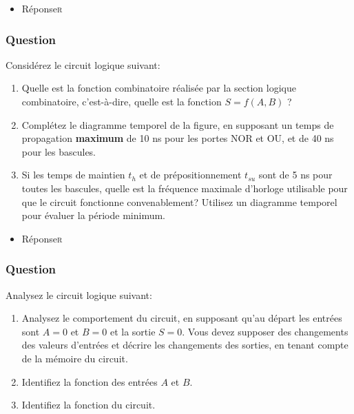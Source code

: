 \documentclass[11pt]{article}
\begin{document}
\begin{itemize}
\item Réponse\hfill{}\textsc{r}
\label{sec:orge0a9138}
\end{itemize}

\subsubsection*{Question}
\label{sec:orgdc3d4f6}
 Considérez le circuit logique suivant:
\begin{center}

\end{center}

\begin{enumerate}
\item Quelle est la fonction combinatoire réalisée par la section
logique combinatoire, c'est-à-dire, quelle est la fonction \(S =
         f(A,B)\) ?

\item Complétez le diagramme temporel de la figure, en supposant un
temps de propagation \textbf{maximum} de 10 ns pour les portes NOR et OU,
et de 40 ns pour les bascules.

\item Si les temps de maintien \(t_{h}\) et de prépositionnement \(t_{su}\)
sont de 5 ns pour toutes les bascules, quelle est la fréquence
maximale d'horloge utilisable pour que le circuit fonctionne
convenablement? Utilisez un diagramme temporel pour évaluer la
période minimum.
\end{enumerate}

\begin{itemize}
\item Réponse\hfill{}\textsc{r}
\label{sec:orgba7511a}
\end{itemize}

\subsubsection*{Question}
\label{sec:org9fb47fd}
 Analysez le circuit logique suivant:
\begin{center}

\end{center}

\begin{enumerate}
\item Analysez le comportement du circuit, en supposant qu'au départ les
entrées sont \(A=0\) et \(B=0\) et la sortie \(S=0\). Vous devez
supposer des changements des valeurs d'entrées et décrire les
changements des sorties, en tenant compte de la mémoire du
circuit.

\item Identifiez la fonction des entrées \(A\) et \(B\).

\item Identifiez la fonction du circuit.
\end{enumerate}
\end{document}
